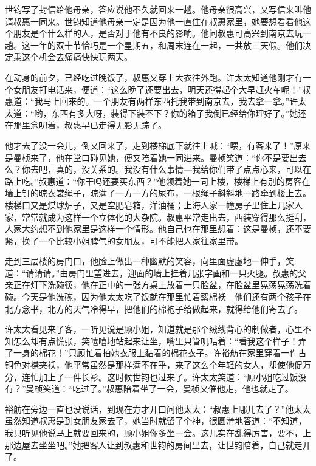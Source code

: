 \par 世钧写了封信给他母亲，答应说他不久就回来一趟。他母亲很高兴，又写信来叫他请叔惠一同来。世钧知道他母亲一定是因为他一直住在叔惠家里，她要想看看他这个朋友是个什么样的人，是否对于他有不良的影响。他问叔惠可高兴到南京去玩一趟。这一年的双十节恰巧是一个星期五，和周末连在一起，一共放三天假。他们决定乘这个机会去痛痛快快玩两天。
\par 在动身的前夕，已经吃过晚饭了，叔惠又穿上大衣往外跑。许太太知道他刚才有一个女朋友打电话来，便道：“这么晚了还要出去，明天还得起个大早赶火车呢！”叔惠道：“我马上回来的。一个朋友有两样东西托我带到南京去，我去拿一拿。”许太太道：“哟，东西有多大呀，装得下装不下？你的箱子我倒已经给你理好了。”她还在那里念叨着，叔惠早已走得无影无踪了。
\par 他才去了没一会儿，倒又回来了，走到楼梯底下就往上喊：“喂，有客来了！”原来是曼桢来了，他在堂口碰见她，便又陪着她一同进来。曼桢笑道：“你不是要出去么？你去吧，真的，没关系的。我没有什么事情—我给你们带了点点心来，可以在路上吃。”叔惠道：“你干吗还要买东西？”他领着她一同上楼，楼梯上有别的房客在墙上钉的晾衣裳绳子，晾满了一方一方的尿布，一根绳子斜斜地一路牵到楼上去。楼梯口又是煤球炉子，又是空肥皂箱，洋油桶；上海人家一幢房子里住上几家人家，常常就成为这样一个立体化的大杂院。叔惠平常走出去，西装穿得那么挺刮，人家大约想不到他家里是这样一个情形。他自己也在那里想着：这是曼桢，还不要紧，换了一个比较小姐脾气的女朋友，可不能把人家往家里带。
\par 走到三层楼的房门口，他脸上做出一种幽默的笑容，向里面虚虚地一伸手，笑道：“请请请。”由房门里望进去，迎面的墙上挂着几张字画和一只火腿。叔惠的父亲正在灯下洗碗筷，他在正中的一张方桌上放着一只脸盆，在脸盆里晃荡晃荡洗着碗。今天是他洗碗，因为他太太吃了饭就在那里忙着絮棉袄—他们还有两个孩子在北方念书，北方的天气冷得早，把他们的棉袍子给做起来，就得给他们寄去了。
\par 许太太看见来了客，一听见说是顾小姐，知道就是那个绒线背心的制做者，心里不知怎么却有点慌张，笑嘻嘻地站起来让坐，嘴里只管叽咕着：“看我这个样子！弄了一身的棉花！”只顾忙着拍她衣服上黏着的棉花衣子。许裕舫在家里穿着一件古铜色对襟夹袄，他平常虽然是那样满不在乎，来了这么个年轻的女人，却使他促万分，连忙加上了一件长衫。这时候世钧也过来了。许太太笑道：“顾小姐吃过饭没有？”曼桢笑道：“吃过了。”叔惠陪着坐了一会，曼桢又催他走，他也就走了。
\par 裕舫在旁边一直也没说话，到现在方才开口问他太太：“叔惠上哪儿去了？”他太太虽然知道叔惠是到女朋友家去了，她当时就留了个神，很圆滑地答道：“不知道，我只听见他说马上就要回来的，顾小姐你多坐一会。这儿实在乱得厉害，要不，上那边屋去坐坐吧。”她把客人让到叔惠和世钧的房间里去，让世钧陪着，自己就走开了。
